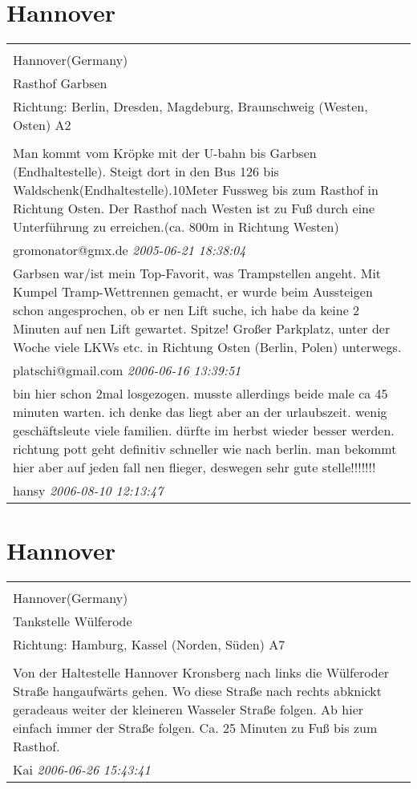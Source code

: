 \documentclass[a4paper,12pt]{article}
\begin{document}
\section{Hannover}
\begin{tabular}{|p{13cm}|}
\hline\\
Hannover(Germany)\\
Rasthof Garbsen\\
Richtung: Berlin, Dresden, Magdeburg, Braunschweig (Westen, Osten) A2 \\
\hline\\
Man kommt vom Kröpke mit der U-bahn bis Garbsen (Endhaltestelle). Steigt dort in den Bus 126 bis Waldschenk(Endhaltestelle).10Meter Fussweg bis zum Rasthof in Richtung Osten. Der Rasthof nach Westen ist zu Fuß durch eine Unterführung zu erreichen.(ca. 800m in Richtung Westen) \\
gromonator@gmx.de \textit{ 2005-06-21 18:38:04 }\\\hline Garbsen war/ist mein Top-Favorit, was Trampstellen angeht. Mit Kumpel Tramp-Wettrennen gemacht, er wurde beim Aussteigen schon angesprochen, ob er nen Lift suche, ich habe da keine 2 Minuten auf nen Lift gewartet. Spitze! Großer Parkplatz, unter der Woche viele LKWs etc. in Richtung Osten (Berlin, Polen) unterwegs. \\
platschi@gmail.com \textit{ 2006-06-16 13:39:51 }\\\hline bin hier schon 2mal losgezogen. musste allerdings beide male ca 45 minuten warten. ich denke das liegt aber an der urlaubszeit. wenig geschäftsleute viele familien. dürfte im herbst wieder besser werden. richtung pott geht definitiv schneller wie nach berlin. man bekommt hier aber auf jeden fall nen flieger, deswegen sehr gute stelle!!!!!!! \\
hansy \textit{ 2006-08-10 12:13:47 }\\\hline
\end{tabular}


\section{Hannover}
\begin{tabular}{|p{13cm}|}
\hline\\
Hannover(Germany)\\
Tankstelle Wülferode\\
Richtung: Hamburg, Kassel (Norden, Süden) A7 \\
\hline\\
Von der Haltestelle Hannover Kronsberg nach links die Wülferoder Straße hangaufwärts gehen. Wo diese Straße nach rechts abknickt geradeaus weiter der kleineren Wasseler Straße folgen. Ab hier einfach immer der Straße folgen. Ca. 25 Minuten zu Fuß bis zum Rasthof. \\
Kai \textit{ 2006-06-26 15:43:41 }\\\hline
\end{tabular}
\end{document}
